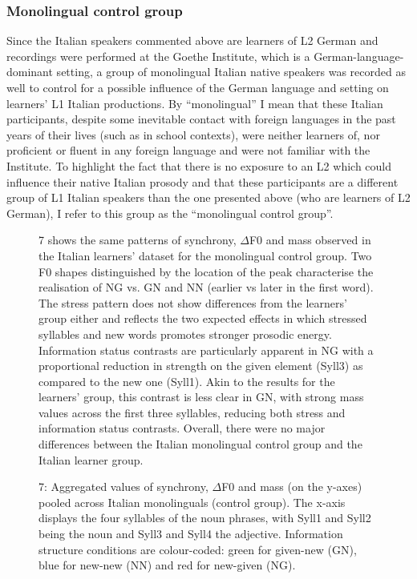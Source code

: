 \subsubsection{Monolingual control group}
\hypertarget{Toc191305898}{}
Since the Italian speakers commented above are learners of L2 German and recordings were performed at the Goethe Institute, which is a German-language-dominant setting, a group of monolingual Italian native speakers was recorded as well to control for a possible influence of the German language and setting on learners’ L1 Italian productions. By “monolingual” I mean that these Italian participants, despite some inevitable contact with foreign languages in the past years of their lives (such as in school contexts), were neither learners of, nor proficient or fluent in any foreign language and were not familiar with the Institute. To highlight the fact that there is no exposure to an L2 which could influence their native Italian prosody and that these participants are a different group of L1 Italian speakers than the one presented above (who are learners of L2 German), I refer to this group as the “monolingual control group”.

\begin{figure}
\caption{7 shows the same patterns of synchrony, ${\Delta}$F0 and mass observed in the Italian learners’ dataset for the monolingual control group. Two F0 shapes distinguished by the location of the peak characterise the realisation of NG vs. GN and NN (earlier vs later in the first word). The stress pattern does not show differences from the learners’ group either and reflects the two expected effects in which stressed syllables and new words promotes stronger prosodic energy. Information status contrasts are particularly apparent in NG with a proportional reduction in strength on the given element (Syll3) as compared to the new one (Syll1). Akin to the results for the learners’ group, this contrast is less clear in GN, with strong mass values across the first three syllables, reducing both stress and information status contrasts. Overall, there were no major differences between the Italian monolingual control group and the Italian learner group.}
\label{fig:key:2}
\end{figure}

  
 

\begin{stylecaption}\begin{figure}
\caption{7: Aggregated values of synchrony, ${\Delta}$F0 and mass (on the y-axes) pooled across Italian monolinguals (control group). The x-axis displays the four syllables of the noun phrases, with Syll1 and Syll2 being the noun and Syll3 and Syll4 the adjective. Information structure conditions are colour-coded: green for given-new (GN), blue for new-new (NN) and red for new-given (NG).} 
\label{fig:key:2}
\end{figure}\end{stylecaption}

